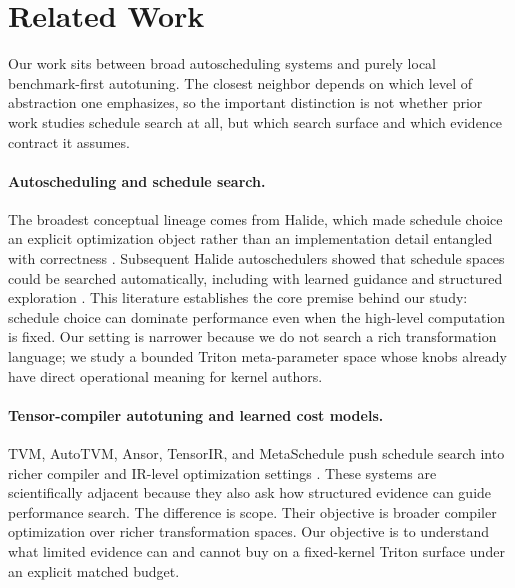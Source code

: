 \section{Related Work}
\label{sec:related}

Our work sits between broad autoscheduling systems and purely local benchmark-first autotuning. The closest neighbor depends on which level of abstraction one emphasizes, so the important distinction is not whether prior work studies schedule search at all, but which search surface and which evidence contract it assumes.



\paragraph{Autoscheduling and schedule search.}
The broadest conceptual lineage comes from Halide, which made schedule choice an explicit optimization object rather than an implementation detail entangled with correctness \citep{ragankelley2012halide}. Subsequent Halide autoschedulers showed that schedule spaces could be searched automatically, including with learned guidance and structured exploration \citep{mullapudi2016halide,adams2019halide}. This literature establishes the core premise behind our study: schedule choice can dominate performance even when the high-level computation is fixed. Our setting is narrower because we do not search a rich transformation language; we study a bounded Triton meta-parameter space whose knobs already have direct operational meaning for kernel authors.

\paragraph{Tensor-compiler autotuning and learned cost models.}
TVM, AutoTVM, Ansor, TensorIR, and MetaSchedule push schedule search into richer compiler and IR-level optimization settings \citep{chen2018tvm,chen2018learningtensor,zheng2020ansor,shao2022metaschedule,zheng2022tensorir}. These systems are scientifically adjacent because they also ask how structured evidence can guide performance search. The difference is scope. Their objective is broader compiler optimization over richer transformation spaces. Our objective is to understand what limited evidence can and cannot buy on a fixed-kernel Triton surface under an explicit matched budget.

